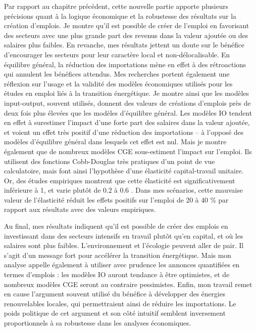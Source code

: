 Par rapport au chapitre précédent, cette nouvelle partie apporte plusieurs précisions quant à la logique économique et la robustesse des résultats sur la création d’emplois. 
Je montre qu’il est possible de créer de l’emploi en favorisant des secteurs avec une plus grande part des revenus dans la valeur ajoutée ou des salaires plus faibles. En revanche, mes résultats jettent un doute sur le bénéfice d’encourager les secteurs pour leur caractère local et non-délocalisable. En équilibre général, la réduction des importations mène en effet à des rétroactions qui annulent les bénéfices attendus.
Mes recherches portent également une réflexion sur l’usage et la validité des modèles économiques utilisés pour les études en emploi liés à la transition énergétique. Je montre ainsi que les modèles input-output, souvent utilisés, donnent des valeurs de créations d’emplois près de deux fois plus élevées que les modèles d’équilibre général. Les modèles IO tendent en effet à surestimer l’impact d’une forte part des salaires dans la valeur ajoutée, et voient un effet très positif d’une réduction des importations – à l’opposé des modèles d’équilibre général dans lesquels cet effet est nul.
Mais je montre également que de nombreux modèles CGE sous-estiment l’impact sur l’emploi. Ils utilisent des fonctions Cobb-Douglas très pratiques d’un point de vue calculatoire, mais font ainsi l’hypothèse d’une élasticité capital-travail unitaire. Or, des études empiriques montrent que cette élasticité est significativement inférieure à 1, et varie plutôt de 0.2 à 0.6 \citep{VanderWerf2008}. Dans mes scénarios, cette mauvaise valeur de l’élasticité réduit les effets positifs sur l’emploi de 20 à 40 \% par rapport aux résultats avec des valeurs empiriques. 

Au final, mes résultats indiquent qu’il est possible de créer des emplois en investissant dans des secteurs intensifs en travail plutôt qu’en capital, et où les salaires sont plus faibles. L’environnement et l’écologie peuvent aller de pair. Il s’agit d’un message fort pour accélérer la transition énergétique.
Mais mon analyse appelle également à utiliser avec prudence les annonces quantifiées en termes d’emplois : les modèles IO auront tendance à être optimistes, et de nombreux modèles CGE seront au contraire pessimistes.
Enfin, mon travail remet en cause l’argument souvent utilisé du bénéfice à développer des énergies renouvelables locales, qui permettraient ainsi de réduire les importations. Le poids politique de cet argument et son côté intuitif semblent inversement proportionnels à sa robustesse dans les analyses économiques.


